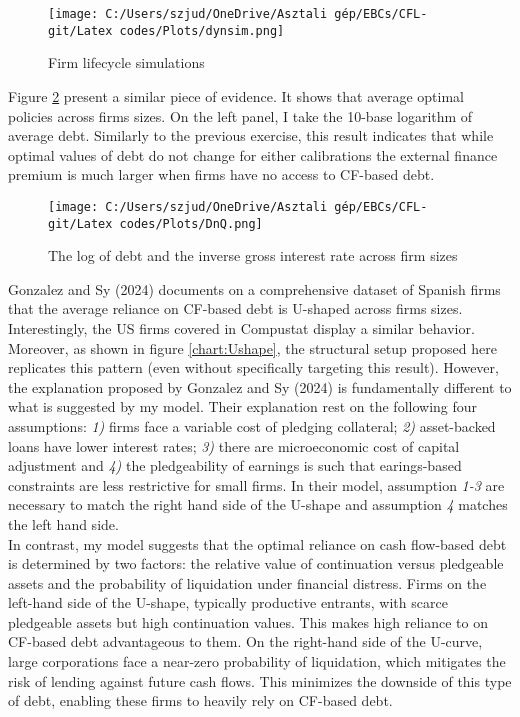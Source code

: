 \documentclass[12pt]{article}
\begin{document}
\begin{figure}[H]  %
    \centering
    \texttt{[image: C:/Users/szjud/OneDrive/Asztali gép/EBCs/CFL-git/Latex codes/Plots/dynsim.png]}
    \caption{Firm lifecycle simulations} \label{chart:dynsim}
\end{figure}

\noindent Figure \ref{chart:DnQ} present a similar piece of evidence. It shows that average optimal policies across firms sizes. On the left panel, I take the 10-base logarithm of average debt. Similarly to the previous exercise, this result indicates that while optimal values of debt do not change for either calibrations the external finance premium is much larger when firms have no access to CF-based debt. 

\begin{figure}[H]  %
    \centering
    \texttt{[image: C:/Users/szjud/OneDrive/Asztali gép/EBCs/CFL-git/Latex codes/Plots/DnQ.png]}
    \caption{The log of debt and the inverse gross interest rate across firm sizes} \label{chart:DnQ}
\end{figure}

\noindent Gonzalez and Sy (2024) documents on a comprehensive dataset of Spanish firms that the average reliance on CF-based debt is U-shaped across firms sizes. Interestingly, the US firms covered in Compustat display a similar behavior.  Moreover, as shown in figure \ref{chart:Ushape}, the structural setup proposed here replicates this pattern (even without specifically targeting this result). However, the explanation proposed by Gonzalez and Sy (2024) is fundamentally different to what is suggested by my model. Their explanation rest on the following four assumptions: \textit{1)} firms face a variable cost of pledging collateral; \textit{2)} asset-backed loans have lower interest rates; \textit{3)} there are microeconomic cost of capital adjustment and \textit{4)} the pledgeability of earnings is such that earings-based constraints are less restrictive for small firms. In their model, assumption \textit{1-3} are necessary to match the right hand side of the U-shape and assumption \textit{4} matches the left hand side. \vspace{3mm} \\
In contrast, my model suggests that the optimal reliance on cash flow-based debt is determined by two factors: the relative value of continuation versus pledgeable assets and the probability of liquidation under financial distress. Firms on the left-hand side of the U-shape, typically productive entrants, with scarce pledgeable assets but high continuation values. This makes high reliance to on CF-based debt advantageous to them. On the right-hand side of the U-curve, large corporations face a near-zero probability of liquidation, which mitigates the risk of lending against future cash flows. This minimizes the downside of this type of debt, enabling these firms to heavily rely on CF-based debt.
\end{document}
